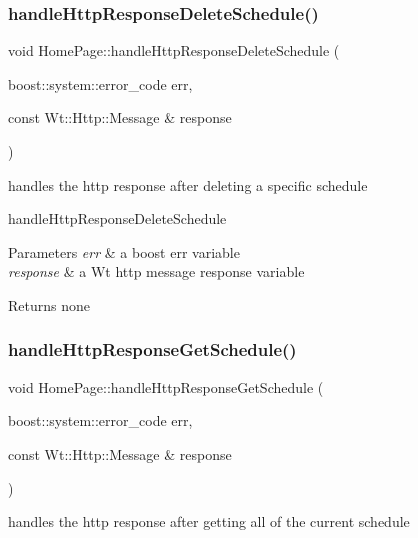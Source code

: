 \subsubsection{\texorpdfstring{handle\+Http\+Response\+Delete\+Schedule()}{handleHttpResponseDeleteSchedule()}}
{\footnotesize\ttfamily void Home\+Page\+::handle\+Http\+Response\+Delete\+Schedule (\begin{DoxyParamCaption}\item[{boost\+::system\+::error\+\_\+code}]{err,  }\item[{const Wt\+::\+Http\+::\+Message \&}]{response }\end{DoxyParamCaption})\hspace{0.3cm}{\ttfamily [private]}}



handles the http response after deleting a specific schedule 

handle\+Http\+Response\+Delete\+Schedule 
\begin{DoxyParams}{Parameters}
{\em err} & a boost err variable \\
\hline
{\em response} & a Wt http message response variable \\
\hline
\end{DoxyParams}
\begin{DoxyReturn}{Returns}
none 
\end{DoxyReturn}
\mbox{\label{class_home_page_a84f498dee2335d7f6d11e89105cb82bc}} 
\subsubsection{\texorpdfstring{handle\+Http\+Response\+Get\+Schedule()}{handleHttpResponseGetSchedule()}}
{\footnotesize\ttfamily void Home\+Page\+::handle\+Http\+Response\+Get\+Schedule (\begin{DoxyParamCaption}\item[{boost\+::system\+::error\+\_\+code}]{err,  }\item[{const Wt\+::\+Http\+::\+Message \&}]{response }\end{DoxyParamCaption})\hspace{0.3cm}{\ttfamily [private]}}



handles the http response after getting all of the current schedule 

